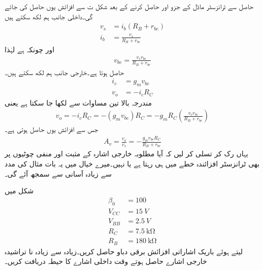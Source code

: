 حاصل  سے ٹرانزسٹر ماڈل کے جزو  اور  حاصل کرنے کے بعد شکل  ت سے افزائش  یوں حاصل کی جائے گی۔داخلی جانب ہم لکھ سکتے ہیں
\begin{align*}
v_s&=i_b \left (R_B+r_{be} \right )\\
i_b&=\frac{v_s}{R_B+r_{be}}
\end{align*}
اور چونکہ  ہے لہٰذا
\begin{align*}
v_{be}=\frac{v_s r_{be}}{R_B+r_{be}}
\end{align*}
حاصل ہوتا ہے۔خارجی جانب ہم لکھ سکتے ہیں۔
\begin{align*}
i_c&=g_m v_{be}\\
v_o&=-i_c R_C
\end{align*}
مندرجہ بالا تین  مساوات سے   لکھا جا سکتا ہے یعنی
\begin{align*}
v_o = -i_c R_C = -\left(g_m v_{be} \right )R_C=-g_m R_C \left(\frac{v_s r_{be}}{R_B+r_{be}} \right )
\end{align*}
جس سے افزائش  یوں حاصل ہوتی ہے۔
\begin{align} \label{مساوات_ٹرانزسٹر_ایمپلیفائر_بغیر_مخارج_مزاحمت_کی_افزائش}
A_v = \frac{v_o}{v_s}=-\frac{g_m r_{be} R_C}{R_B+r_{be}}
\end{align}
	یہاں رک کر تسلی کر لیں کہ آیا مطلوبہ خارجی اشارہ   کے مثبت اور منفی چوٹیوں پر بھی ٹرانزسٹر افزائندہ خطے میں ہی رہتا ہے یا نہیں۔میرے خیال میں یہ بات مثال کی مدد سے زیادہ آسانی سے سمجھ آئے گی۔

شکل   میں
\begin{align*}
\beta_0&=\num{100}\\
V_{CC}&=\SI{15}{V}\\
V_{BB}&=\SI{2.5}{V}\\
R_C&=\SI{7.5}{ \kilo \ohm}\\
R_B&=\SI{180}{\kilo \ohm}
\end{align*}
لیتے ہوئے باریک اشاراتی افزائش برقی دباو  حاصل کریں۔زیادہ سے زیادہ نا تراشیدہ خارجی اشارے حاصل ہوتے وقت داخلی اشارے کا حیطہ دریافت کریں۔

